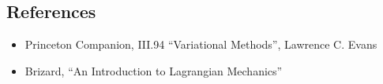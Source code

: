 \subsection{References}
\begin{itemize}
\item Princeton Companion, III.94 ``Variational Methods'', Lawrence C. Evans
\item Brizard, ``An Introduction to Lagrangian Mechanics''
\end{itemize}







